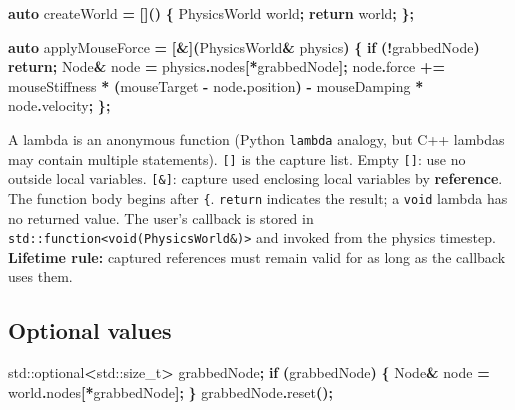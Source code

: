 \documentclass[
  10pt,
  a4paper,
]{article}
\newenvironment{Shaded}{\begin{snugshade}}{\end{snugshade}}
\newcommand{\BuiltInTok}[1]{#1}
\newcommand{\ControlFlowTok}[1]{\textcolor[rgb]{0.13,0.29,0.53}{\textbf{#1}}}
\newcommand{\KeywordTok}[1]{\textcolor[rgb]{0.13,0.29,0.53}{\textbf{#1}}}
\newcommand{\NormalTok}[1]{#1}
\newcommand{\OperatorTok}[1]{\textcolor[rgb]{0.81,0.36,0.00}{\textbf{#1}}}
\begin{document}
\begin{Shaded}
\begin{Highlighting}[]
\KeywordTok{auto}\NormalTok{ createWorld }\OperatorTok{=} \OperatorTok{[]()} \OperatorTok{\{}
\NormalTok{    PhysicsWorld world}\OperatorTok{;}
    \ControlFlowTok{return}\NormalTok{ world}\OperatorTok{;}
\OperatorTok{\};}

\KeywordTok{auto}\NormalTok{ applyMouseForce }\OperatorTok{=} \OperatorTok{[\&](}\NormalTok{PhysicsWorld}\OperatorTok{\&}\NormalTok{ physics}\OperatorTok{)} \OperatorTok{\{}
    \ControlFlowTok{if} \OperatorTok{(!}\NormalTok{grabbedNode}\OperatorTok{)} \ControlFlowTok{return}\OperatorTok{;}
\NormalTok{    Node}\OperatorTok{\&}\NormalTok{ node }\OperatorTok{=}\NormalTok{ physics}\OperatorTok{.}\NormalTok{nodes}\OperatorTok{[*}\NormalTok{grabbedNode}\OperatorTok{];}
\NormalTok{    node}\OperatorTok{.}\NormalTok{force }\OperatorTok{+=}\NormalTok{ mouseStiffness }\OperatorTok{*} \OperatorTok{(}\NormalTok{mouseTarget }\OperatorTok{{-}}\NormalTok{ node}\OperatorTok{.}\NormalTok{position}\OperatorTok{)}
                \OperatorTok{{-}}\NormalTok{ mouseDamping }\OperatorTok{*}\NormalTok{ node}\OperatorTok{.}\NormalTok{velocity}\OperatorTok{;}
\OperatorTok{\};}
\end{Highlighting}
\end{Shaded}

A lambda is an anonymous function (Python \texttt{lambda} analogy, but
C++ lambdas may contain multiple statements). \texttt{{[}{]}} is the
capture list. Empty \texttt{{[}{]}}: use no outside local variables.
\texttt{{[}\&{]}}: capture used enclosing local variables by
\textbf{reference}. The function body begins after \texttt{\{}.
\texttt{return} indicates the result; a \texttt{void} lambda has no
returned value. The user's callback is stored in
\texttt{std::function\textless{}void(PhysicsWorld\&)\textgreater{}} and
invoked from the physics timestep. \textbf{Lifetime rule:} captured
references must remain valid for as long as the callback uses them.

\subsection{Optional values}\label{optional-values}

\begin{Shaded}
\begin{Highlighting}[]
\BuiltInTok{std::}\NormalTok{optional}\OperatorTok{\textless{}}\BuiltInTok{std::}\NormalTok{size\_t}\OperatorTok{\textgreater{}}\NormalTok{ grabbedNode}\OperatorTok{;}
\ControlFlowTok{if} \OperatorTok{(}\NormalTok{grabbedNode}\OperatorTok{)} \OperatorTok{\{}
\NormalTok{    Node}\OperatorTok{\&}\NormalTok{ node }\OperatorTok{=}\NormalTok{ world}\OperatorTok{.}\NormalTok{nodes}\OperatorTok{[*}\NormalTok{grabbedNode}\OperatorTok{];}
\OperatorTok{\}}
\NormalTok{grabbedNode}\OperatorTok{.}\NormalTok{reset}\OperatorTok{();}
\end{Highlighting}
\end{Shaded}
\end{document}
